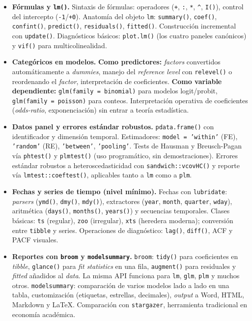 \documentclass[11pt,letterpaper]{article}
\begin{document}
\begin{itemize}[leftmargin=*, itemsep=2pt]
    \item \textbf{Fórmulas y \texttt{lm()}.} Sintaxis de fórmulas: operadores (\texttt{+}, \texttt{:}, \texttt{*}, \texttt{\textasciicircum}, \texttt{I()}), control del intercepto (\texttt{-1}/\texttt{+0}). Anatomía del objeto \texttt{lm}: \texttt{summary()}, \texttt{coef()}, \texttt{confint()}, \texttt{predict()}, \texttt{residuals()}, \texttt{fitted()}. Construcción incremental con \texttt{update()}. Diagnósticos básicos: \texttt{plot.lm()} (los cuatro paneles canónicos) y \texttt{vif()} para multicolinealidad.
    \item \textbf{Categóricos en modelos.} \textbf{Como predictores:} \textit{factors} convertidos automáticamente a \textit{dummies}, manejo del \textit{reference level} con \texttt{relevel()} o reordenando el \textit{factor}, interpretación de coeficientes. \textbf{Como variable dependiente:} \texttt{glm(family = binomial)} para modelos logit/probit, \texttt{glm(family = poisson)} para conteos. Interpretación operativa de coeficientes (\textit{odds-ratio}, exponenciación) sin entrar a teoría estadística.
    \item \textbf{Datos panel y errores estándar robustos.} \texttt{pdata.frame()} con identificador y dimensión temporal. Estimadores: \texttt{model = 'within'} (FE), \texttt{'random'} (RE), \texttt{'between'}, \texttt{'pooling'}. Tests de Hausman y Breusch-Pagan vía \texttt{phtest()} y \texttt{plmtest()} (uso programático, sin demostraciones). Errores estándar robustos a heteroscedasticidad con \texttt{sandwich::vcovHC()} y reporte vía \texttt{lmtest::coeftest()}, aplicables tanto a \texttt{lm} como a \texttt{plm}.
    \item \textbf{Fechas y series de tiempo (nivel mínimo).} Fechas con \texttt{lubridate}: \textit{parsers} (\texttt{ymd()}, \texttt{dmy()}, \texttt{mdy()}), extractores (\texttt{year}, \texttt{month}, \texttt{quarter}, \texttt{wday}), aritmética (\texttt{days()}, \texttt{months()}, \texttt{years()}) y secuencias temporales. Clases básicas: \texttt{ts} (regular), \texttt{zoo} (irregular), \texttt{xts} (heredera moderna); conversión entre \texttt{tibble} y series. Operaciones de diagnóstico: \texttt{lag()}, \texttt{diff()}, ACF y PACF visuales. 
    \item \textbf{Reportes con \texttt{broom} y \texttt{modelsummary}.} \texttt{broom}: \texttt{tidy()} para coeficientes en \textit{tibble}, \texttt{glance()} para \textit{fit statistics} en una fila, \texttt{augment()} para residuales y \textit{fitted} añadidos al \textit{data}. La misma API funciona para \texttt{lm}, \texttt{glm}, \texttt{plm} y muchos otros. \texttt{modelsummary}: comparación de varios modelos lado a lado en una tabla, customización (etiquetas, estrellas, decimales), \textit{output} a Word, HTML, Markdown y LaTeX. Comparación con \texttt{stargazer}, herramienta tradicional en economía académica.
\end{itemize}
\end{document}
